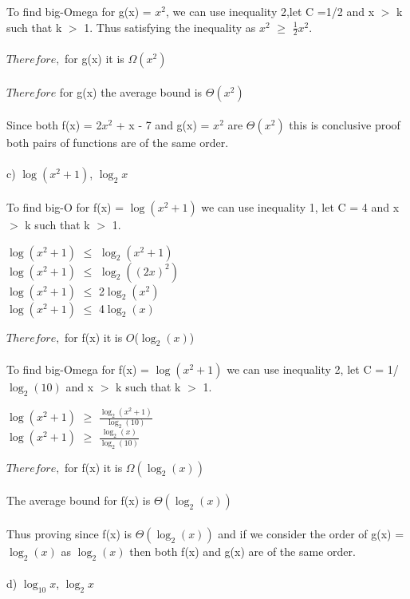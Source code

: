 \documentclass{article}
\begin{document}
To find big-Omega for g(x) = $x^2$, we can use inequality 2,let C =1/2 and  x $>$ k such that k $>$ 1. Thus satisfying the inequality as $x^2$ $\geq$ $\frac{1}{2}$$x^2$. \\\\ $Therefore,$ for g(x) it is $\Omega(x^2)$ \\ \\  
$Therefore$ for g(x) the average bound is $\Theta(x^2)$ \\\\ 
Since both f(x) = 2$x^2$ + x - 7 and g(x) = $x^2$ are  $\Theta(x^2)$ this is conclusive proof both pairs of functions are of the same order. \\\\
c) $\log(x^2 + 1 )$, $\log_{2}{x}$ \\ \\ 
To find big-O for f(x) =  $\log(x^2 + 1)$ we can use inequality 1, let C = 4 and x $>$ k such that k $>$ 1.
\begin{center}
$\log(x^2 + 1 )$ $\leq$ $\log_{2}{(x^2 + 1)}$ \\
$\log(x^2 + 1 )$ $\leq$ $\log_{2}{((2x)^2)}$ \\
$\log(x^2 + 1 )$ $\leq$ 2$\log_{2}{(x^2)}$ \\
$\log(x^2 + 1 )$ $\leq$ 4$\log_{2}{(x)}$ \\
\end{center}
$Therefore,$ for f(x) it is $O$($\log_{2}{(x)}$) \\ \\ 
To find big-Omega for f(x) =  $\log(x^2 + 1)$ we can use inequality 2, let C = 1/$\log_{2}{(10)}$ and x $>$ k such that k $>$ 1. 
\begin{center}
$\log(x^2 + 1 )$ $\geq$ $\frac {\log_{2}{(x^2+1)}}{\log_{2}{(10)}}$ \\
$\log(x^2 + 1 )$ $\geq$ $\frac {\log_{2}{(x)}}{\log_{2}{(10)}}$  \\
\end{center}
$Therefore,$ for f(x) it is $\Omega(\log_{2}{(x)})$ \\ \\ 
The average bound for f(x) is $\Theta(\log_{2}{(x)})$ \\ \\ 
Thus proving since f(x) is $\Theta(\log_{2}{(x)})$ and if we consider the order of g(x) = $\log_{2}{(x)}$ as $\log_{2}{(x)}$ then both f(x) and g(x) are of the same order. \\ \\
d) $\log_{10}{x}$, $\log_{2}{x}$ \\ \\ 
$$
\end{document}
